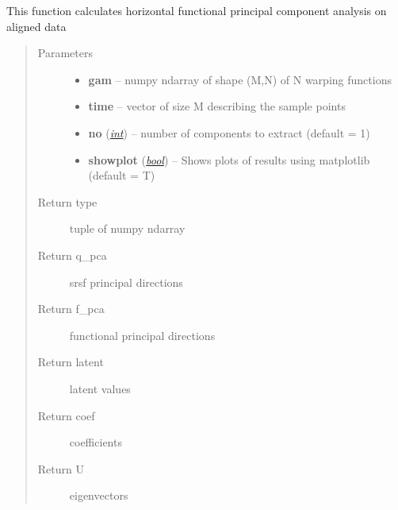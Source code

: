 \documentclass[letterpaper,10pt,english]{sphinxmanual}
\begin{document}
\begin{fulllineitems}
\label{fPCA:fPCA.horizfPCA}
This function calculates horizontal functional principal component analysis on aligned data
\begin{quote}\begin{description}
\item[{Parameters}] \leavevmode\begin{itemize}
\item {} 
\textbf{gam} -- numpy ndarray of shape (M,N) of N warping functions

\item {} 
\textbf{time} -- vector of size M describing the sample points

\item {} 
\textbf{no} (\href{http://docs.python.org/library/functions.html\#int}{\emph{int}}) -- number of components to extract (default = 1)

\item {} 
\textbf{showplot} (\href{http://docs.python.org/library/functions.html\#bool}{\emph{bool}}) -- Shows plots of results using matplotlib (default = T)

\end{itemize}

\item[{Return type}] \leavevmode
tuple of numpy ndarray

\item[{Return q\_pca}] \leavevmode
srsf principal directions

\item[{Return f\_pca}] \leavevmode
functional principal directions

\item[{Return latent}] \leavevmode
latent values

\item[{Return coef}] \leavevmode
coefficients

\item[{Return U}] \leavevmode
eigenvectors

\end{description}\end{quote}

\end{fulllineitems}

\end{document}
